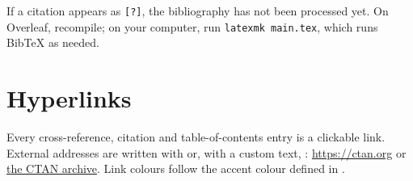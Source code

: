 \begin{tip}
If a citation appears as \texttt{[?]}, the bibliography has not been
processed yet. On Overleaf, recompile; on your computer, run
\texttt{latexmk main.tex}, which runs BibTeX as needed.
\end{tip}

\section{Hyperlinks}\label{sec:hyperlinks}

Every cross-reference, citation and table-of-contents entry is a clickable
link. External addresses are written with  or, with a custom text,
: \url{https://ctan.org} or \href{https://ctan.org}{the CTAN
archive}. Link colours follow the accent colour defined in
.
